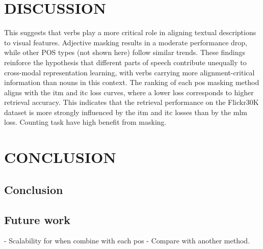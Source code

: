 \chapter{DISCUSSION}
This suggests that verbs play a more critical role in aligning textual descriptions to visual features.
Adjective masking results in a moderate performance drop, while other POS types (not shown here) follow similar trends.
These findings reinforce the hypothesis that different parts of speech contribute unequally to cross-modal representation learning, with verbs carrying more alignment-critical information than nouns in this context.
The ranking of each \acrshort{pos} masking method aligns with the \acrshort{itm} and \acrshort{itc} loss curves, where a lower loss corresponds to higher retrieval accuracy.
This indicates that the retrieval performance on the Flickr30K dataset is more strongly influenced by the \acrshort{itm} and \acrshort{itc} losses than by the \acrshort{mlm} loss.
Counting task have high benefit from masking.
\chapter{CONCLUSION}
\section{Conclusion}
\section{Future work}
- Scalability for when combine with each pos
- Compare with another method.